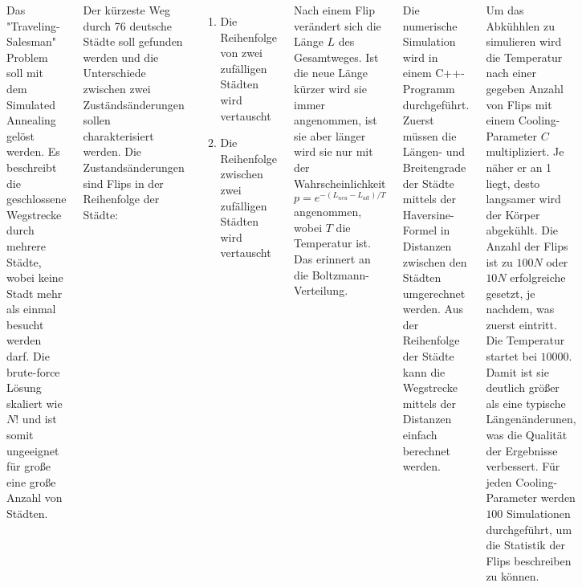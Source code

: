 \documentclass[35pt, a0paper, portrait]{tikzposter}
\begin{document}
\begin{columns}
  {
    Das "Traveling-Salesman" Problem soll mit dem Simulated Annealing gelöst werden. Es beschreibt die geschlossene Wegstrecke durch mehrere Städte, wobei keine Stadt mehr als einmal besucht werden darf. Die brute-force Lösung skaliert wie $N!$ und ist somit ungeeignet für große eine große Anzahl von Städten.

    Der kürzeste Weg durch 76 deutsche Städte soll gefunden werden und die Unterschiede zwischen zwei Zuständsänderungen sollen charakterisiert werden. Die Zustandsänderungen sind Flips in der Reihenfolge der Städte:

    \begin{enumerate}
      \item Die Reihenfolge von zwei zufälligen Städten wird vertauscht
      \item Die Reihenfolge zwischen zwei zufälligen Städten wird vertauscht
    \end{enumerate}

    Nach einem Flip verändert sich die Länge $L$ des Gesamtweges. Ist die neue Länge kürzer wird sie immer angenommen, ist sie aber länger wird sie nur mit der Wahrscheinlichkeit
    \begin{equation}
      p = e^{- (L_{neu} - L_{alt})/T}
    \end{equation}
    angenommen, wobei $T$ die Temperatur ist. Das erinnert an die Boltzmann-Verteilung.
  }

  {
    Die numerische Simulation wird in einem C++-Programm durchgeführt. Zuerst müssen die Längen- und Breitengrade der Städte mittels der Haversine-Formel in Distanzen zwischen den Städten umgerechnet werden. Aus der Reihenfolge der Städte kann die Wegstrecke mittels der Distanzen einfach berechnet werden.

    Um das Abkühhlen zu simulieren wird die Temperatur nach einer gegeben Anzahl von Flips mit einem Cooling-Parameter $C$ multipliziert. Je näher er an 1 liegt, desto langsamer wird der Körper abgekühlt.  Die Anzahl der Flips ist zu $100N$ oder $10N$ erfolgreiche gesetzt, je nachdem, was zuerst eintritt. Die Temperatur startet bei $10000$. Damit ist sie deutlich größer als eine typische Längenänderunen, was die Qualität der Ergebnisse verbessert. Für jeden Cooling-Parameter werden $100$ Simulationen durchgeführt, um die Statistik der Flips beschreiben zu können.
    }
\end{columns}
\end{document}
